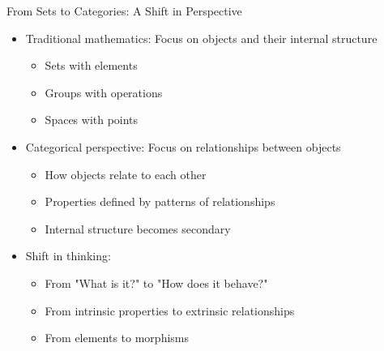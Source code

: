 \documentclass{beamer}
\begin{document}
\begin{frame}{From Sets to Categories: A Shift in Perspective}
    \begin{itemize}
        \item Traditional mathematics: Focus on objects and their internal structure
            \begin{itemize}
                \item Sets with elements
                \item Groups with operations
                \item Spaces with points
            \end{itemize}
        \item Categorical perspective: Focus on relationships between objects
            \begin{itemize}
                \item How objects relate to each other
                \item Properties defined by patterns of relationships
                \item Internal structure becomes secondary
            \end{itemize}
        \item Shift in thinking:
            \begin{itemize}
                \item From "What is it?" to "How does it behave?"
                \item From intrinsic properties to extrinsic relationships
                \item From elements to morphisms
            \end{itemize}
    \end{itemize}
\end{frame}
\end{document}
